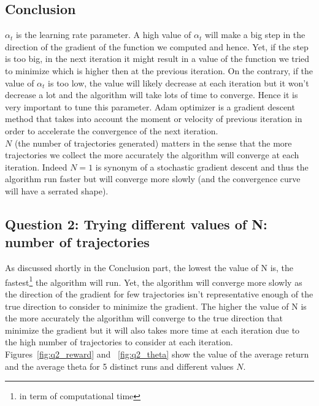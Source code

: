 \documentclass[11pt]{article}
\numberwithin{figure}{section} %
\begin{document}
\subsection{Conclusion}
$\alpha_t$ is the learning rate parameter. A high value of $\alpha_t$ will make a big step in the direction of the gradient of the function we computed and hence. Yet, if the step is too big, in the next iteration it might result in a value of the function we tried to minimize which is higher then at the previous iteration. On the contrary, if the value of $\alpha_t$ is too low, the value will likely decrease at each iteration but it won't decrease a lot and the algorithm will take lots of time to converge. Hence it is very important to tune this parameter. Adam optimizer is a gradient descent method that takes into account the moment or velocity of previous iteration in order to accelerate the convergence of the next iteration. \\
$N$ (the number of trajectories generated) matters in the sense that the more trajectories we collect the more accurately the algorithm will converge at each iteration. Indeed $N=1$ is synonym of a stochastic gradient descent and thus the algorithm run faster but will converge more slowly (and the convergence curve will have a serrated shape).

\subsection{Question 2: Trying different values of N: number of trajectories}
As discussed shortly in the Conclusion part, the lowest the value of N is, the fastest\footnote{in term of computational time} the algorithm will run. Yet, the algorithm will converge more slowly as the direction of the gradient for few trajectories isn't representative enough of the true direction to consider to minimize the gradient. The higher the value of N is the more accurately the algorithm will converge to the true direction that minimize the gradient but it will also takes more time at each iteration due to the high number of trajectories to consider at each iteration. Figures~\ref{fig:q2_reward} and ~\ref{fig:q2_theta} show the value of the average return and the average theta for 5 distinct runs and different values $N$.
\end{document}
